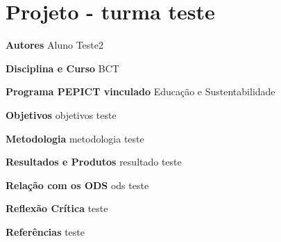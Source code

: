 \documentclass[12pt,openright,oneside,a4paper]{report}
\begin{document}
\newpage
\section{Projeto - turma teste}
\noindent
\textbf{Autores}
Aluno Teste2

\vspace{0.7cm}
\noindent
\textbf{Disciplina e Curso}
BCT

\vspace{0.7cm}
\noindent
\textbf{Programa PEPICT vinculado}
Educação e Sustentabilidade

\vspace{0.7cm}
\noindent
\textbf{Objetivos}
objetivos teste

\vspace{0.7cm}
\noindent
\textbf{Metodologia}
metodologia teste

\vspace{0.7cm}
\noindent
\textbf{Resultados e Produtos}
resultado teste

\vspace{0.7cm}
\noindent
\textbf{Relação com os ODS}
ods teste

\vspace{0.7cm}
\noindent
\textbf{Reflexão Crítica}
teste

\vspace{0.7cm}
\noindent
\textbf{Referências}
teste

\vspace{0.7cm}
\end{document}
